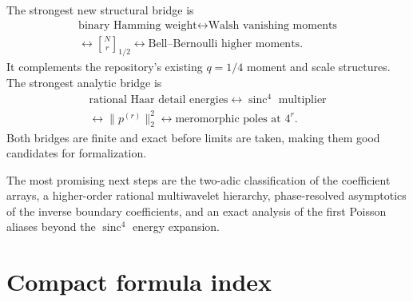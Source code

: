 \documentclass[11pt,oneside]{article}
\theoremstyle{definition}
\theoremstyle{remark}
\newcommand{\sinc}{\operatorname{sinc}}
\newcommand{\qbinom}[3]{\genfrac{[}{]}{0pt}{}{#1}{#2}_{#3}}
\begin{document}
The strongest new structural bridge is
\[
 \begin{gathered}
 \text{binary Hamming weight}
 \longleftrightarrow
 \text{Walsh vanishing moments}\\
 \longleftrightarrow
 \qbinom{N}{r}{1/2}
 \longleftrightarrow
 \text{Bell--Bernoulli higher moments}.
 \end{gathered}
\]
It complements the repository's existing $q=1/4$ moment and scale structures.
The strongest analytic bridge is
\[
 \begin{gathered}
 \text{rational Haar detail energies}
 \longleftrightarrow
 \sinc^4\text{ multiplier}\\
 \longleftrightarrow
 \|p^{(r)}\|_2^2
 \longleftrightarrow
 \text{meromorphic poles at }4^r.
 \end{gathered}
\]
Both bridges are finite and exact before limits are taken, making them good
candidates for formalization.

The most promising next steps are the two-adic classification of the coefficient
arrays, a higher-order rational multiwavelet hierarchy, phase-resolved
asymptotics of the inverse boundary coefficients, and an exact analysis of the
first Poisson aliases beyond the $\sinc^4$ energy expansion.

\appendix

\section{Compact formula index}
\label{app:formula-index}
\end{document}
